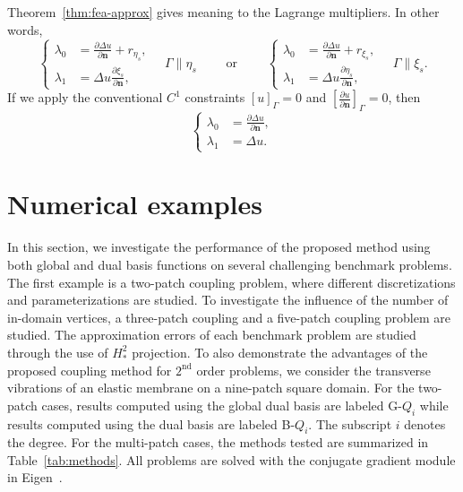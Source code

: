 \begin{remark}
  Theorem~\ref{thm:fea-approx} gives meaning to the Lagrange multipliers. In other words,
  \begin{equation}
    \left\{\begin{split}
      \lambda_0 &= \frac{\partial \Delta u}{\partial \mathbf{n}} + r_{\eta_s},\\
      \lambda_1 &= \Delta u \frac{\partial \xi_s}{\partial \mathbf{n}},
    \end{split}\right.\quad \Gamma\parallel \eta_s
    \quad\quad\text{ or }\quad\quad
    \left\{\begin{split}
      \lambda_0 &= \frac{\partial \Delta u}{\partial \mathbf{n}} + r_{\xi_s},\\
      \lambda_1 &= \Delta u \frac{\partial \eta_s}{\partial \mathbf{n}},
    \end{split}\right.\quad \Gamma\parallel \xi_s.
  \end{equation}
  If we apply the conventional $C^1$ constraints $\left[u\right]_\Gamma=0$ and $\left[\frac{\partial u}{\partial \mathbf{n}}\right]_\Gamma=0$, then
  \begin{equation}
    \left\{\begin{split}
      \lambda_0 &= \frac{\partial \Delta u}{\partial \mathbf{n}},\\
      \lambda_1 &= \Delta u.
    \end{split}\right.
  \end{equation}
\end{remark}

\section{Numerical examples}\label{sec:numerical_examples}

In this section, we investigate the performance of the proposed method using both global and \Bezier dual basis functions on several challenging benchmark problems. The first example is a two-patch coupling problem, where different discretizations and parameterizations are studied. To investigate the influence of the number of in-domain vertices, a three-patch coupling and a five-patch coupling problem are studied. The approximation errors of each benchmark problem are studied through the use of $H^2_*$ projection. To also demonstrate the advantages of the proposed coupling method for $2^\text{nd}$ order problems, we consider the transverse vibrations of an elastic membrane on a nine-patch square domain. For the two-patch cases, results computed using the global dual basis are labeled G-$Q_i$ while results computed using the \Bezier dual basis are labeled B-$Q_i$. The subscript $i$ denotes the degree. For the multi-patch cases, the methods tested are summarized in Table~\ref{tab:methods}. All problems are solved with the conjugate gradient module in Eigen~\cite{eigenweb}.


